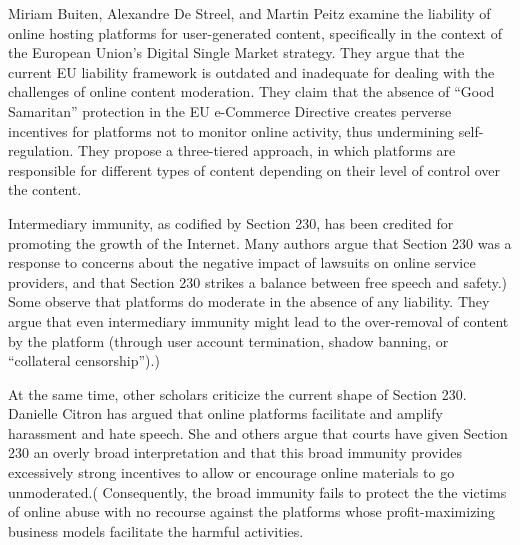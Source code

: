 Miriam Buiten, Alexandre De Streel, and Martin Peitz examine the liability of online hosting platforms for user-generated content, specifically in the context of the European Union's Digital Single Market strategy. They argue that the current EU liability framework is outdated and inadequate for dealing with the challenges of online content moderation. They claim that the absence of ``Good Samaritan'' protection in the EU e-Commerce Directive creates perverse incentives for platforms not to monitor online activity, thus undermining self-regulation. They propose a three-tiered approach, in which platforms are responsible for different types of content depending on their level of control over the content. 

Intermediary immunity, as codified by Section 230, has been credited for promoting the growth of the Internet. Many authors argue that Section 230 was a response to concerns about the negative impact of lawsuits on online service providers, and that Section 230 strikes a balance between free speech and safety.)
Some observe that platforms do moderate in the absence of any liability. They argue that even intermediary immunity might lead to the over-removal of content by the platform (through user account termination, shadow banning, or ``collateral censorship'').)

At the same time, other scholars criticize the current shape of Section 230. Danielle Citron has argued that online platforms facilitate and amplify harassment and hate speech. She and others argue that courts have given Section 230 an overly broad interpretation and that this broad immunity provides excessively strong incentives to allow or encourage online materials to go unmoderated.( Consequently, the broad immunity fails to protect the the victims of online abuse with no recourse against the platforms whose profit-maximizing business models facilitate the harmful activities.


